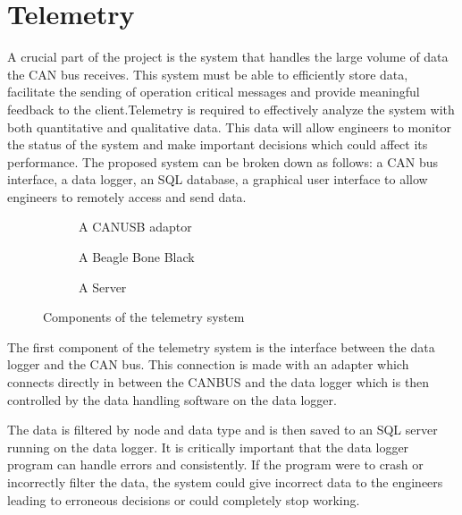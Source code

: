 \documentclass[10pt,a4paper]{article}
\begin{document}
\section{Telemetry}
A crucial part of the project is the system that handles the large volume of data the CAN bus receives. This system must be able to efficiently store data, facilitate the sending of operation critical messages and provide meaningful feedback to the client.Telemetry is required to effectively analyze the system with both quantitative and qualitative data. This data will allow engineers to monitor the status of the system and make important decisions which could affect its performance. The proposed system can be broken down as follows: a CAN bus interface, a data logger, an SQL database, a graphical user interface to allow engineers to remotely access and send data.
\begin{figure}
         \centering
         \begin{subfigure}[b]{0.6\textwidth}
                 \caption{A CANUSB adaptor}
                 \label{fig:CANUSB adaptor}
         \end{subfigure}

         \begin{subfigure}[b]{0.4\textwidth}
                 \caption{A Beagle Bone Black}
                 \label{fig:Beable Bone Black}
         \end{subfigure}

         \begin{subfigure}[b]{0.5\textwidth}
                 \caption{A Server}
                 \label{fig:Sever}
         \end{subfigure}
         \caption{Components of the telemetry system}\label{fig:telemetry}
\end{figure}
The first component of the telemetry system is the interface between the data logger and the CAN bus. This connection is made with an adapter which connects directly in between the CANBUS and the data logger which is then controlled by the data handling software on the data logger.

The data is filtered by node and data type and is then saved to an SQL server running on the data logger. It is critically important that the data logger program can handle errors and consistently. If the program were to crash or incorrectly filter the data, the system could give incorrect data to the engineers leading to erroneous decisions or could completely stop working.
\end{document}

